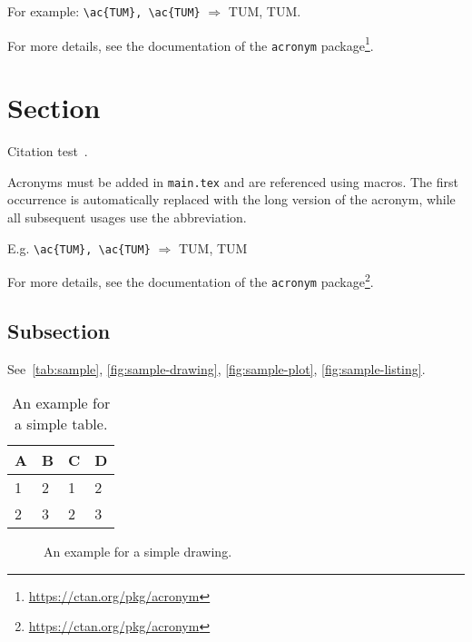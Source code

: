 For example: \texttt{\textbackslash ac\{TUM\}, \textbackslash ac\{TUM\}} $\Rightarrow$ \ac{TUM}, \ac{TUM}.

For more details, see the documentation of the \texttt{acronym} package\footnote{\url{https://ctan.org/pkg/acronym}}.


\section{Section}
Citation test~\parencite{latex}.


Acronyms must be added in \texttt{main.tex} and are referenced using macros. The first occurrence is automatically replaced with the long version of the acronym, while all subsequent usages use the abbreviation.

E.g. \texttt{\textbackslash ac\{TUM\}, \textbackslash ac\{TUM\}} $\Rightarrow$ \ac{TUM}, \ac{TUM}

For more details, see the documentation of the \texttt{acronym} package\footnote{\url{https://ctan.org/pkg/acronym}}.
\subsection{Subsection}

See~\autoref{tab:sample}, \autoref{fig:sample-drawing}, \autoref{fig:sample-plot}, \autoref{fig:sample-listing}.

\begin{table}[htpb]
  \caption[Example table]{An example for a simple table.}\label{tab:sample}
  \centering
  \begin{tabular}{l l l l}
    \toprule
      A & B & C & D \\
    \midrule
      1 & 2 & 1 & 2 \\
      2 & 3 & 2 & 3 \\
    \bottomrule
  \end{tabular}
\end{table}

\begin{figure}[htpb]
  \centering
  \caption[Example drawing]{An example for a simple drawing.}\label{fig:sample-drawing}
\end{figure}

